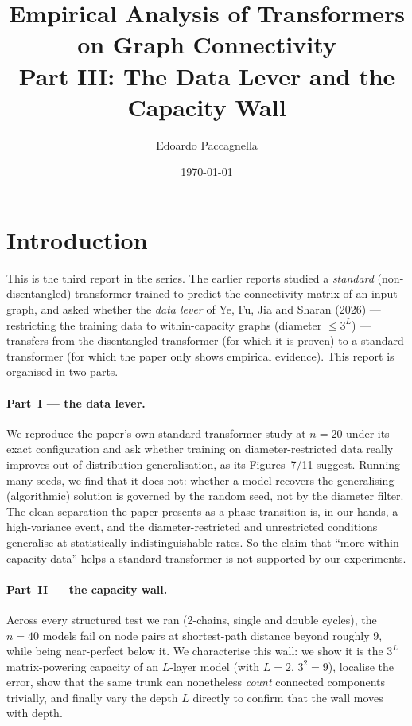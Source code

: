 \documentclass[11pt,a4paper]{article}
\title{Empirical Analysis of Transformers on Graph Connectivity \\
       \large Part III: The Data Lever and the Capacity Wall}
\author{Edoardo Paccagnella}
\date{\today}
\begin{document}
\maketitle

\section{Introduction}
\label{sec:intro}

This is the third report in the series. The earlier reports studied a
\emph{standard} (non-disentangled) transformer trained to predict the
connectivity matrix of an input graph, and asked whether the \emph{data lever}
of Ye, Fu, Jia and Sharan (2026) --- restricting the training data to
within-capacity graphs (diameter $\le 3^L$) --- transfers from the disentangled
transformer (for which it is proven) to a standard transformer (for which the
paper only shows empirical evidence). This report is organised in two parts.

\paragraph{Part~I --- the data lever.} We reproduce the paper's own
standard-transformer study at $n = 20$ under its exact configuration and ask
whether training on diameter-restricted data really improves out-of-distribution
generalisation, as its Figures~7/11 suggest. Running many seeds, we find that it
does not: whether a model recovers the generalising (algorithmic) solution is
governed by the random seed, not by the diameter filter. The clean separation
the paper presents as a phase transition is, in our hands, a high-variance event,
and the diameter-restricted and unrestricted conditions generalise at
statistically indistinguishable rates. So the claim that ``more within-capacity
data'' helps a standard transformer is not supported by our experiments.

\paragraph{Part~II --- the capacity wall.} Across every structured test we ran
(2-chains, single and double cycles), the $n = 40$ models fail on node pairs at
shortest-path distance beyond roughly $9$, while being near-perfect below it.
We characterise this wall: we show it is the $3^L$ matrix-powering capacity of an
$L$-layer model (with $L = 2$, $3^2 = 9$), localise the error, show that the same
trunk can nonetheless \emph{count} connected components trivially, and finally
vary the depth $L$ directly to confirm that the wall moves with depth.
\end{document}
